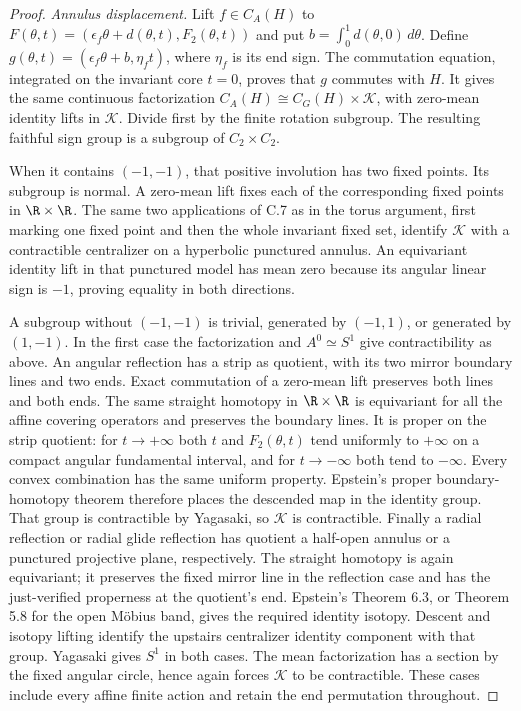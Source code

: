 \begin{proof}
\emph{Annulus displacement.}
Lift $f\in C_A(H)$ to
$F(\theta,t)=(\epsilon_f\theta+d(\theta,t),F_2(\theta,t))$ and put
$b=\int_0^1d(\theta,0)\,d\theta$. Define
$g(\theta,t)=(\epsilon_f\theta+b,\eta_f t)$, where $\eta_f$ is its
end sign. The commutation equation, integrated on the invariant core
$t=0$, proves that $g$ commutes with $H$. It gives the same continuous
factorization $C_A(H)\cong C_G(H)\times\mathcal K$, with zero-mean
identity lifts in $\mathcal K$. Divide first by the finite rotation
subgroup. The resulting faithful sign group is a subgroup of
$C_2\times C_2$.

When it contains $(-1,-1)$, that positive involution has two fixed
points. Its subgroup is normal. A zero-mean lift fixes each of the
corresponding fixed points in $\R\times\R$. The same two applications
of C.7 as in the torus argument, first marking one fixed point and then
the whole invariant fixed set, identify $\mathcal K$ with a contractible
centralizer on a hyperbolic punctured annulus. An equivariant identity
lift in that punctured model has mean zero because its angular linear
sign is $-1$, proving equality in both directions.

A subgroup without $(-1,-1)$ is trivial, generated by $(-1,1)$, or
generated by $(1,-1)$. In the first case the factorization and
$A^0\simeq S^1$ give contractibility as above. An angular reflection
has a strip as quotient, with its two mirror boundary lines and two
ends. Exact commutation of a zero-mean lift preserves both lines and
both ends. The same straight homotopy in $\R\times\R$ is equivariant
for all the affine covering operators and preserves the boundary
lines. It is proper on the strip quotient: for $t\to+\infty$ both
$t$ and $F_2(\theta,t)$ tend uniformly to $+\infty$ on a compact
angular fundamental interval, and for $t\to-\infty$ both tend to
$-\infty$. Every convex combination has the same uniform property.
Epstein's proper boundary-homotopy theorem therefore places the
descended map in the identity group. That group is contractible by
Yagasaki, so $\mathcal K$ is contractible.
Finally a radial reflection or radial glide reflection has quotient a
half-open annulus or a punctured projective plane, respectively. The
straight homotopy is again equivariant; it preserves the fixed mirror
line in the reflection case and has the just-verified properness at
the quotient's end. Epstein's Theorem 6.3, or Theorem 5.8 for the open
M\"obius band, gives the required identity isotopy. Descent and isotopy
lifting identify the upstairs centralizer identity component with that
group. Yagasaki gives $S^1$ in both cases. The mean factorization has a
section by the fixed angular circle, hence again forces
$\mathcal K$ to be contractible. These cases include every affine
finite action and retain the end permutation throughout.


\end{proof}
